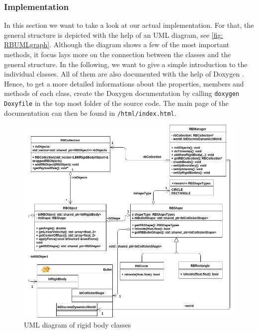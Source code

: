 \subsubsection{Implementation}
In this section we want to take a look at our actual implementation. For that, the general structure is depicted with the help of an UML diagram, see \autoref{fig: RBUMLgraph}. Although the diagram shows a few of the most important methods, it focus lays more on the connection between the classes and the general structure. In the following, we want to give a simple introduction to the individual classes. All of them are also documented with the help of Doxygen \cite{Doxygen}. Hence, to get a more detailed informations about the properties, members and methods of each class, create the Doxygen documentation by calling \texttt{doxygen Doxyfile} in the top most folder of the source code. The main page of the documentation can then be found in \texttt{/html/index.html}.
\begin{figure}[ht]
\centering
\includegraphics[scale=0.5]{img/RigidBodies/RigidBodyUML.png}
\caption{UML diagram of rigid body classes}
\label{fig: RBUMLgraph}
\end{figure}

